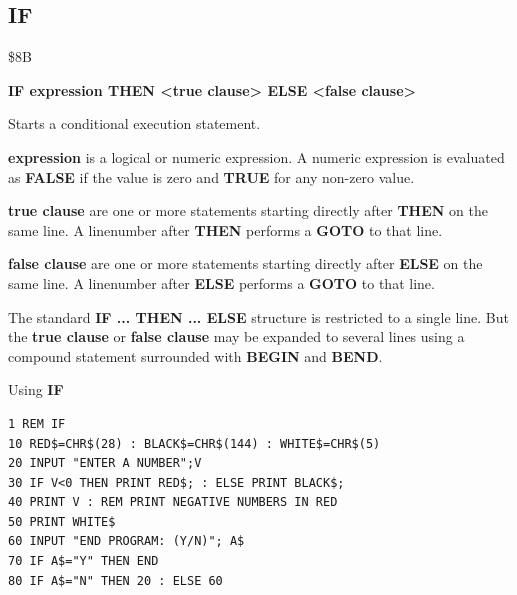 \subsection{IF}
\begin{description}[leftmargin=2cm,style=nextline]
\item [Token:] \$8B
\item [Format:] {\bf IF expression THEN <true clause> ELSE <false clause>}
\item [Usage:] Starts a conditional execution
               statement.

               {\bf expression} is a logical or numeric expression.
               A numeric expression is evaluated as {\bf FALSE}
               if the value is zero and {\bf TRUE} for any non-zero
               value.

               {\bf true clause} are one or more statements starting
               directly after {\bf THEN} on the same line.
               A linenumber after {\bf THEN} performs a
               {\bf GOTO} to that line.

               {\bf false clause} are one or more statements starting
               directly after {\bf ELSE} on the same line.
               A linenumber after {\bf ELSE} performs a
               {\bf GOTO} to that line.

\item [Remarks:]
               The standard {\bf IF ... THEN ... ELSE} structure
               is restricted to a single line. But the {\bf true clause}
               or {\bf false clause} may be expanded to several lines
               using a compound statement surrounded with
               {\bf BEGIN} and {\bf BEND}.
\item [Example:]
                Using {\bf IF}
\begin{tcolorbox}[colback=black,coltext=white]
\verbatimfont{\codefont}
\begin{verbatim}
1 REM IF
10 RED$=CHR$(28) : BLACK$=CHR$(144) : WHITE$=CHR$(5)
20 INPUT "ENTER A NUMBER";V
30 IF V<0 THEN PRINT RED$; : ELSE PRINT BLACK$;
40 PRINT V : REM PRINT NEGATIVE NUMBERS IN RED
50 PRINT WHITE$
60 INPUT "END PROGRAM: (Y/N)"; A$
70 IF A$="Y" THEN END
80 IF A$="N" THEN 20 : ELSE 60
\end{verbatim}
\end{tcolorbox}
\end{description}


